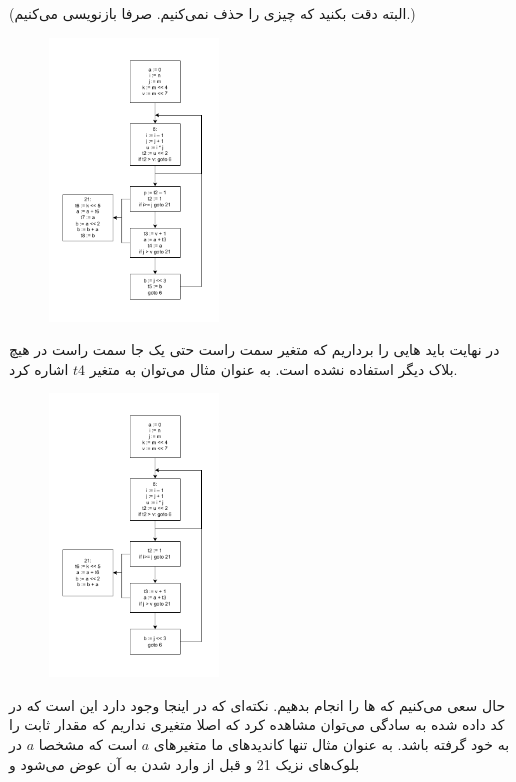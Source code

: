 \documentclass[]{article}
\begin{document}
(البته دقت بکنید که چیزی را حذف نمی‌کنیم. صرفا بازنویسی می‌کنیم.)
\begin{figure}[H]
    \centering
    \includegraphics[width=0.4\textwidth]{figure/Q5-03-CopyPropagation.pdf}
\end{figure}
در نهایت باید
هایی
را برداریم که متغیر سمت راست حتی یک جا سمت راست در هیچ بلاک دیگر استفاده نشده است. به عنوان 
مثال می‌توان به متغیر
$t4$
اشاره کرد.
\begin{figure}[H]
    \centering
    \includegraphics[width=0.4\textwidth]{figure/Q5-04-DeadCode.pdf}
\end{figure}
حال سعی می‌کنیم که
ها
را انجام بدهیم. نکته‌ای که در اینجا وجود دارد این است که در کد داده شده به سادگی می‌توان
مشاهده کرد که اصلا متغیری نداریم که مقدار ثابت را به خود گرفته باشد. به عنوان مثال تنها کاندید‌های
ما متغیر‌های
$a$
است که مشخصا
$a$
در بلوک‌های نزیک 21 و قبل از وارد شدن به آن عوض می‌شود و
\end{document}
